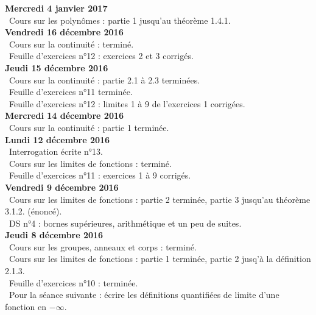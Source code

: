 \documentclass[12pt,a4paper]{article}
\begin{document}
\noindent\textbf{Mercredi 4 janvier 2017}\\
\bu\ Cours sur les polynômes : partie  1 jusqu'au théorème 1.4.1.\vspace{.4cm}\\

\noindent\textbf{Vendredi 16 décembre 2016}\\
\bu\ Cours sur la continuité : terminé.\\
\bu\ Feuille d'exercices n°12 : exercices 2 et 3 corrigés.\vspace{.4cm}\\

\noindent\textbf{Jeudi 15 décembre 2016}\\
\bu\ Cours sur la continuité : partie 2.1 à 2.3 terminées.\\
\bu\ Feuille d'exercices n°11 terminée.\\
\bu\ Feuille d'exercices n°12 : limites 1 à 9 de l'exercices 1 corrigées.\vspace{.4cm}\\

\noindent\textbf{Mercredi 14 décembre 2016}\\
\bu\ Cours sur la continuité : partie 1 terminée. \vspace{.4cm}\\

\noindent\textbf{Lundi 12 décembre 2016}\\
\bu\ Interrogation écrite n°13.\\
\bu\ Cours sur les limites de fonctions : terminé.\\
\bu\ Feuille d'exercices n°11 : exercices 1 à 9 corrigés. \vspace{.4cm}\\

\noindent\textbf{Vendredi 9 décembre 2016}\\
\bu\ Cours sur les limites de fonctions : partie 2 terminée, partie 3 jusqu'au théorème 3.1.2. (énoncé).\\
\bu\ DS n°4 : bornes supérieures, arithmétique et un peu de suites. \vspace{.4cm}\\

\noindent\textbf{Jeudi 8 décembre 2016}\\
\bu\ Cours sur les groupes, anneaux et corps : terminé.\\
\bu\ Cours sur les limites de fonctions : partie 1 terminée, partie 2 jusq'à la définition 2.1.3.\\
\bu\ Feuille d'exercices n°10 : terminée.\\
\bu\ Pour la séance suivante : écrire les définitions quantifiées de limite d'une fonction en $-\infty$. \vspace{.4cm}\\
\end{document}
